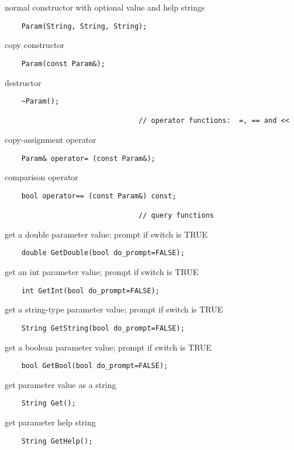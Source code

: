    normal constructor with optional value and help strings
\begin{verbatim}
    Param(String, String, String);
\end{verbatim}

    copy constructor
\begin{verbatim}
    Param(const Param&);
\end{verbatim}

    destructor
\begin{verbatim}
    ~Param();

                                // operator functions:  =, == and <<
\end{verbatim}

    copy-assignment operator
\begin{verbatim}
    Param& operator= (const Param&);
\end{verbatim}
        
    comparison operator
\begin{verbatim}
    bool operator== (const Param&) const;

                                // query functions
\end{verbatim}

    get a double parameter value; prompt if switch is TRUE
\begin{verbatim}
    double GetDouble(bool do_prompt=FALSE);
\end{verbatim}

    get an int parameter value; prompt if switch is TRUE
\begin{verbatim}
    int GetInt(bool do_prompt=FALSE);
\end{verbatim}

    get a string-type parameter value; prompt if switch is TRUE
\begin{verbatim}
    String GetString(bool do_prompt=FALSE);
\end{verbatim}

    get a boolean parameter value; prompt if switch is TRUE
\begin{verbatim}
    bool GetBool(bool do_prompt=FALSE);
\end{verbatim}

    get parameter value as a string
\begin{verbatim}
    String Get();
\end{verbatim}

    get parameter help string
\begin{verbatim}
    String GetHelp();
\end{verbatim}

